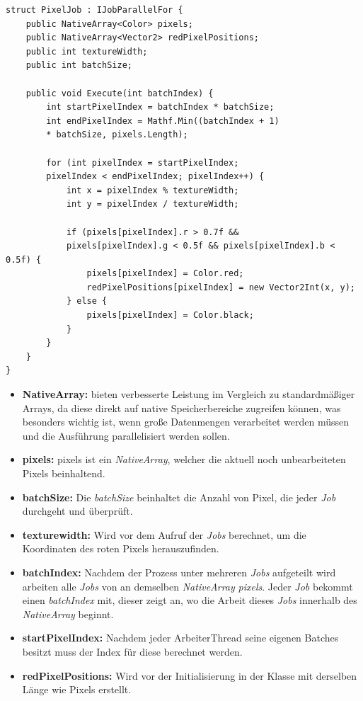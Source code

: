 \begin{lstlisting}[style=csharp, caption={Rote Pixel suche}, label=code:PixelJob]
struct PixelJob : IJobParallelFor {
    public NativeArray<Color> pixels;
    public NativeArray<Vector2> redPixelPositions;
    public int textureWidth;
    public int batchSize;

    public void Execute(int batchIndex) {
        int startPixelIndex = batchIndex * batchSize;
        int endPixelIndex = Mathf.Min((batchIndex + 1)
        * batchSize, pixels.Length);

        for (int pixelIndex = startPixelIndex;
        pixelIndex < endPixelIndex; pixelIndex++) {
            int x = pixelIndex % textureWidth;
            int y = pixelIndex / textureWidth;

            if (pixels[pixelIndex].r > 0.7f &&
            pixels[pixelIndex].g < 0.5f && pixels[pixelIndex].b < 0.5f) {
                pixels[pixelIndex] = Color.red;
                redPixelPositions[pixelIndex] = new Vector2Int(x, y);
            } else {
                pixels[pixelIndex] = Color.black;
            }
        }
    }
}
\end{lstlisting}
\begin{itemize}
    \item \textbf{NativeArray:} bieten verbesserte Leistung im Vergleich zu standardmäßiger Arrays, da diese direkt auf native Speicherbereiche zugreifen können, was besonders wichtig ist, wenn große Datenmengen verarbeitet werden müssen und die Ausführung parallelisiert werden sollen.
    \item \textbf{pixels:} pixels ist ein \textit{NativeArray}, welcher die aktuell noch unbearbeiteten Pixels beinhaltend.
    \item \textbf{batchSize:} Die \textit{batchSize} beinhaltet die Anzahl von Pixel, die jeder \textit{Job} durchgeht und überprüft.
    \item \textbf{texturewidth:} Wird vor dem Aufruf der \textit{Jobs} berechnet, um die Koordinaten des roten Pixels herauszufinden.
    \item \textbf{batchIndex:} Nachdem der Prozess unter mehreren \textit{Jobs} aufgeteilt wird arbeiten alle \textit{Jobs} von an demselben \textit{NativeArray} \textit{pixels}. Jeder \textit{Job} bekommt einen \textit{batchIndex} mit, dieser zeigt an, wo die Arbeit dieses \textit{Jobs} innerhalb des \textit{NativeArray} beginnt.
    \item \textbf{startPixelIndex:} Nachdem jeder ArbeiterThread seine eigenen Batches besitzt muss der Index für diese berechnet werden.
    \item \textbf{redPixelPositions:} Wird vor der Initialisierung in der Klasse mit derselben Länge wie Pixels erstellt.
\end{itemize}


